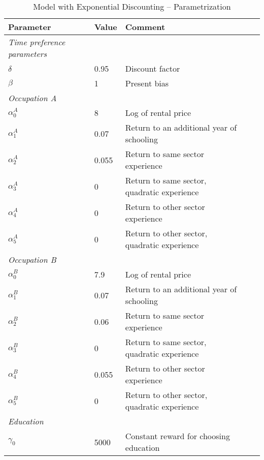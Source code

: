 \setlength\tabcolsep{2pt}
\begin{longtable}{lllll}
\caption{Model with Exponential Discounting -- Parametrization} \\ 
\hline
\textbf{Parameter}					 	& \textbf{Value} &			\textbf{Comment} \\
\midrule
\textit{Time preference parameters} 	&		         &          \\
\midrule
$\delta$								&		    0.95 &			Discount factor \\
$\beta$									&              1 &			Present bias \\
\addlinespace 							
\midrule
\textit{Occupation A}                   &                &          \\
\midrule
$\alpha^A_{0}$ 							&              8 &          Log of rental price \\
$\alpha^A_{1}$ 							&           0.07 &          Return to an additional year of schooling \\
$\alpha^A_{2}$ 							&          0.055 &          Return to same sector experience \\
$\alpha^A_{3}$ 						    &              0 &          Return to same sector, quadratic experience \\
$\alpha^A_{4}$ 							&              0 &          Return to other sector experience \\
$\alpha^A_{5}$ 						    &              0 &          Return to other sector, quadratic experience \\
\addlinespace
\hline
\textit{Occupation B}                   &                &          \\
\hline
$\alpha^B_{0}$ 							&         	 7.9 &          Log of rental price \\
$\alpha^B_{1}$							&        	0.07 &          Return to an additional year of schooling \\
$\alpha^B_{2}$	 						&        	0.06 &          Return to same sector experience \\
$\alpha^B_{3}$	 						&              0 &          Return to same sector, quadratic experience \\
$\alpha^B_{4}$	 						&          0.055 &          Return to other sector experience \\
$\alpha^B_{5}$	 						&              0 &          Return to other sector, quadratic experience \\
\addlinespace
\hline
\textit{Education}						&                &          \\
\hline
$\gamma_0$								&           5000 &          Constant reward for choosing education \\

\end{longtable}
